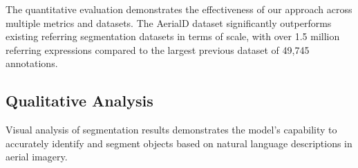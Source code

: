 \begin{table}[H]
\centering
\caption{Comparison with Existing RRSIS Datasets}
\label{tab:dataset_comparison}
\end{table}

The quantitative evaluation demonstrates the effectiveness of our approach across multiple metrics and datasets. The AerialD dataset significantly outperforms existing referring segmentation datasets in terms of scale, with over 1.5 million referring expressions compared to the largest previous dataset of 49,745 annotations.

\subsection{Qualitative Analysis}

Visual analysis of segmentation results demonstrates the model's capability to accurately identify and segment objects based on natural language descriptions in aerial imagery.


